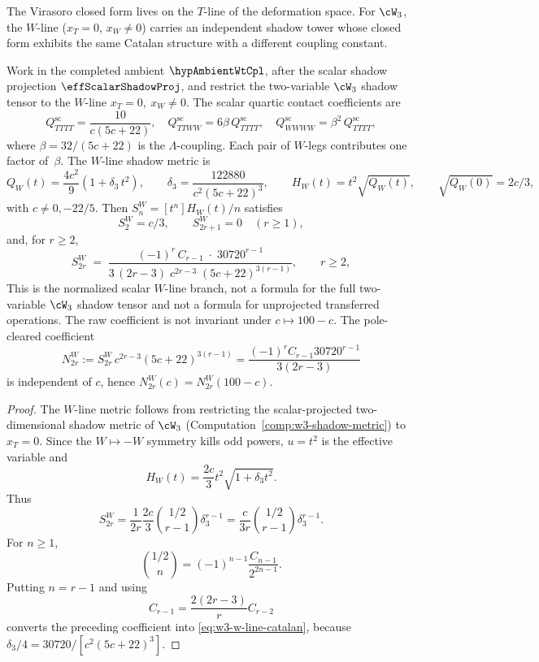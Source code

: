 The Virasoro closed form lives on the $T$-line of the
deformation space. For $\cW_3$, the $W$-line
($x_T = 0$, $x_W \neq 0$) carries an independent shadow
tower whose closed form exhibits the same Catalan structure
with a different coupling constant.

\begin{theorem}
\label{thm:w3-w-line-closed-form}%
%
%
Work in the completed ambient \(\hypAmbientWtCpl\), after the scalar
shadow projection \(\effScalarShadowProj\), and restrict the
two-variable \(\cW_3\) shadow tensor to the \(W\)-line
\(x_T=0,\ x_W\ne0\).  The scalar quartic contact coefficients are
\begin{equation}\label{eq:w3-quartic-decomposition}
Q^{\mathrm{sc}}_{TTTT} = \frac{10}{c(5c{+}22)}, \quad
Q^{\mathrm{sc}}_{TTWW} = 6\beta\, Q^{\mathrm{sc}}_{TTTT}, \quad
Q^{\mathrm{sc}}_{WWWW} = \beta^2\, Q^{\mathrm{sc}}_{TTTT},
\end{equation}
where $\beta = 32/(5c+22)$ is the $\Lambda$-coupling. Each
pair of $W$-legs contributes one factor of~$\beta$. The
$W$-line shadow metric is
\[
Q_W(t) = \frac{4c^2}{9}\left(1 + \delta_3\, t^2\right),\qquad
\delta_3 = \frac{122880}{c^2(5c{+}22)^3},\qquad
H_W(t)=t^2\sqrt{Q_W(t)},\qquad
\sqrt{Q_W(0)}=2c/3 ,
\]
with \(c\ne0,-22/5\).  Then \(S^W_n=[t^n]H_W(t)/n\) satisfies
\[
S_2^W=c/3,\qquad S_{2r+1}^W=0\quad(r\ge1),
\]
and, for \(r\ge2\),
\begin{equation}\label{eq:w3-w-line-catalan}
\boxed{\;
S_{2r}^W
\;=\;
\frac{(-1)^r\, C_{r-1}\; \cdot\; 30720^{r-1}}
 {3\,(2r{-}3)\; c^{2r-3}\; (5c{+}22)^{3(r-1)}},
\qquad r \ge 2,
\;}
\end{equation}
This is the normalized scalar \(W\)-line branch, not a formula for the full two-variable
\(\cW_3\) shadow tensor and not a formula for unprojected transferred operations.
The raw coefficient is not invariant under \(c\mapsto100-c\).  The pole-cleared coefficient
\[
N_{2r}^W
  :=S_{2r}^W\,c^{2r-3}(5c+22)^{3(r-1)}
  =\frac{(-1)^r C_{r-1}30720^{r-1}}{3(2r-3)}
\]
is independent of \(c\), hence \(N_{2r}^W(c)=N_{2r}^W(100-c)\).
\end{theorem}

\begin{proof}
The \(W\)-line metric follows from restricting the scalar-projected
two-dimensional shadow metric of $\cW_3$
\textup{(}Computation~\textup{\ref{comp:w3-shadow-metric}}\textup{)}
to $x_T = 0$.  Since the \(W\mapsto-W\) symmetry kills odd powers,
\(u=t^2\) is the effective variable and
\[
H_W(t)=\frac{2c}{3}t^2\sqrt{1+\delta_3 t^2}.
\]
Thus
\[
S_{2r}^W
=\frac{1}{2r}\frac{2c}{3}
\binom{1/2}{r-1}\delta_3^{r-1}
=\frac{c}{3r}\binom{1/2}{r-1}\delta_3^{r-1}.
\]
For \(n\ge1\),
\[
\binom{1/2}{n}=(-1)^{n-1}\frac{C_{n-1}}{2^{2n-1}}.
\]
Putting \(n=r-1\) and using
\[
C_{r-1}=\frac{2(2r-3)}{r}C_{r-2}
\]
converts the preceding coefficient into
\eqref{eq:w3-w-line-catalan}, because
\(\delta_3/4=30720/[c^2(5c+22)^3]\).
\end{proof}

